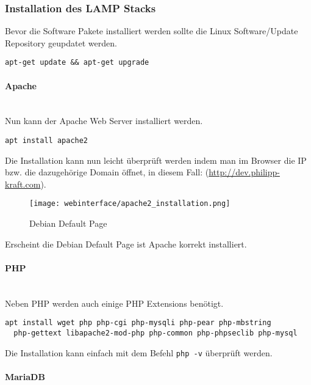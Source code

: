 \subsubsection{Installation des LAMP Stacks}
Bevor die Software Pakete installiert werden sollte die Linux Software/Update
Repository geupdatet werden.

\begin{lstlisting}[caption={Respositorys updaten}]
  apt-get update && apt-get upgrade
\end{lstlisting}

\paragraph{Apache}\mbox{}\\

Nun kann der Apache Web Server installiert werden.

\begin{lstlisting}[caption={Apache installieren}]
  apt install apache2
\end{lstlisting}

Die Installation kann nun leicht überprüft werden indem man im Browser die IP
bzw. die dazugehörige Domain öffnet, in diesem Fall:
(\url{http://dev.philipp-kraft.com}).

\begin{figure}[H]
  \centering
  \texttt{[image: webinterface/apache2\_installation.png]}
  \caption{Debian Default Page}
\end{figure}

Erscheint die Debian Default Page ist Apache korrekt installiert.

\paragraph{PHP}\mbox{}\\
Neben PHP werden auch einige PHP Extensions benötigt.
\begin{lstlisting}[caption={PHP installieren}]
  apt install wget php php-cgi php-mysqli php-pear php-mbstring
  php-gettext libapache2-mod-php php-common php-phpseclib php-mysql
\end{lstlisting}

Die Installation kann einfach mit dem Befehl \verb|php -v| überprüft werden.

\paragraph{MariaDB}\mbox{}\\

